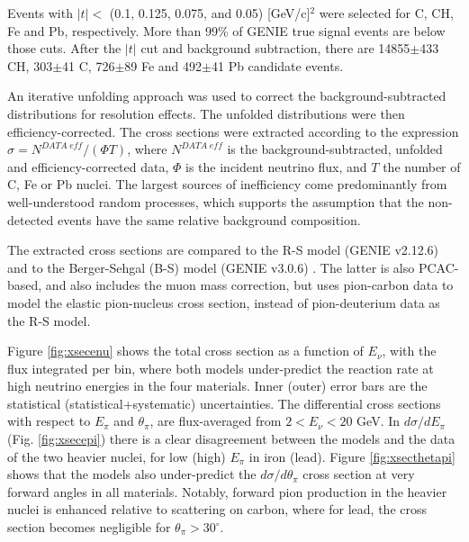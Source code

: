 \documentclass[aps,prl,twocolumn,superscriptaddress,nofootinbib]{revtex4-1}
\begin{document}
\par Events with $\lvert t\rvert\!<$ (0.1, 0.125, 0.075, and 0.05) [GeV/c]$^{2}$ were selected for C, CH, Fe 
and Pb, respectively. More than 99\% of {\small GENIE} true signal events are below those cuts. After the 
$\lvert t\rvert$ cut and background subtraction, there are 14855$\pm$433 CH, 303$\pm$41 C, 726$\pm$89 Fe and 
492$\pm$41 Pb candidate events.

\par An iterative unfolding approach \cite{DAgostini:1994fjx} was used to correct the background-subtracted
distributions for resolution effects. The unfolded distributions were then efficiency-corrected. The cross
sections were extracted according to the expression $\sigma = N^{DATA\;eff}/\left(\Phi T\right)$, where
$N^{DATA\;eff}$ is the background-subtracted, unfolded and efficiency-corrected data, $\Phi$ is the incident
neutrino flux, and $T$ the number of C, Fe or Pb nuclei. The largest sources of inefficiency come
predominantly from well-understood random processes, which supports the assumption that the non-detected
events have the same relative background composition.

\par The extracted cross sections are compared to the R-S model ({\small GENIE} v2.12.6) and to the Berger-Sehgal
(B-S) model ({\small GENIE} v3.0.6) \cite{GENIE:2021zuu, Stowell_2017, Berger:2008xs}. The latter is also 
PCAC-based, and also includes the muon mass correction, but uses pion-carbon data \cite{Paschos:2005km} to 
model the elastic pion-nucleus cross section, instead of pion-deuterium data as the R-S model. 

\par Figure \ref{fig:xsecenu} shows the total cross section as a function of $E_{\nu}$, with the flux
integrated per bin, where both models under-predict the reaction rate at high neutrino energies in the four
materials. Inner (outer) error bars are the statistical (statistical+systematic) uncertainties. The
differential cross sections with respect to $E_{\pi}$ and $\theta_{\pi}$, are flux-averaged from
$2<E_{\nu}<20$ GeV. In $d\sigma/dE_{\pi}$ (Fig. \ref{fig:xsecepi}) there is a clear disagreement between the
models and the data of the two heavier nuclei, for low (high) $E_{\pi}$ in iron (lead). Figure
\ref{fig:xsecthetapi} shows that the models also under-predict the $d\sigma/d\theta_{\pi}$ cross section at
very forward angles in all materials. Notably, forward pion production in the heavier nuclei is enhanced
relative to scattering on carbon, where for lead, the cross section becomes negligible for
$\theta_{\pi}>30^{\circ}$.
\end{document}
